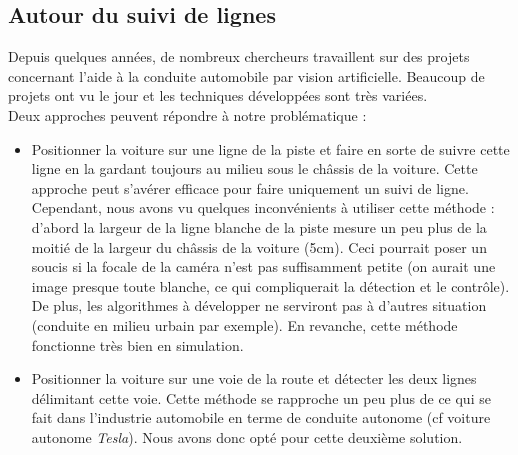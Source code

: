 \documentclass[12pt, openany]{report}
\begin{document}
\subsection{Autour du suivi de lignes}
Depuis quelques années, de nombreux chercheurs travaillent sur
des projets concernant l'aide à la conduite automobile par vision
artificielle. Beaucoup de projets ont vu le jour et les techniques développées sont très variées.\\

Deux approches peuvent répondre à notre problématique :
\begin{itemize}[label=\textbullet, font=\small]
    \item Positionner la voiture sur une ligne de la piste et faire en sorte de suivre cette ligne en la gardant toujours au milieu sous le châssis de la voiture. Cette approche peut s'avérer efficace pour faire uniquement un suivi de ligne. Cependant, nous avons vu quelques inconvénients à utiliser cette méthode : d'abord la largeur de la ligne blanche de la piste mesure un peu plus de la moitié de la largeur du châssis de la voiture (5cm). Ceci pourrait poser un soucis si la focale de la caméra n'est pas suffisamment petite (on aurait une image presque toute blanche, ce qui compliquerait la détection et le contrôle). De plus, les algorithmes à développer ne serviront pas à d'autres situation (conduite en milieu urbain par exemple). En revanche, cette méthode fonctionne très bien en simulation.
    \item Positionner la voiture sur une voie de la route et détecter les deux lignes délimitant cette voie. Cette méthode se rapproche un peu plus de ce qui se fait dans l'industrie automobile en terme de conduite autonome (cf voiture autonome \textit{Tesla}). Nous avons donc opté pour cette deuxième solution.
\end{itemize}
\end{document}
